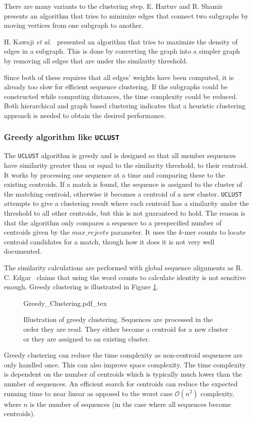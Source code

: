 There are many variants to the clustering step. E. Hartuv and R. Shamir \\
\cite{hartuv} presents an algorithm that tries to minimize edges that
connect two subgraphs by moving vertices from one subgraph to another.

H. Kawaji \textit{et al.}~\cite{kawaji} presented an algorithm that tries to
maximize the density of edges in a subgraph. This is done by converting the
graph into a simpler graph by removing all edges that are under the similarity
threshold.

Since both of these requires that all edges' weights have been computed, it is
already too slow for efficient sequence clustering. If the subgraphs could be
constructed while computing distances, the time complexity could be reduced.
Both hierarchical and graph based clustering indicates that a heuristic
clustering approach is needed to obtain the desired performance.


\subsubsection{Greedy algorithm like \texttt{UCLUST}}

The \texttt{UCLUST} algorithm is greedy and is designed so that all member
sequences have similarity greater than or equal to the similarity threshold,
to their centroid.  It works by processing one sequence at a time and
comparing these to the existing centroids. If a match is found, the sequence
is assigned to the cluster of the matching centroid, otherwise it becomes a
centroid of a new cluster. \texttt{UCLUST} attempts to give a clustering
result where each centroid has a similarity under the threshold to all other
centroids, but this is not guaranteed to hold. The reason is that the
algorithm only compares a sequence to a prespecified number of centroids given
by the $max\_rejects$ parameter. It uses the $k$-mer counts to locate centroid
candidates for a match, though how it does it is not very well documented.

The similarity calculations are performed with global sequence alignments as R.
C. Edgar~\cite{usearch_algorithm}  claims that using the word counts to
calculate identity is not sensitive enough. Greedy clustering is illustrated in
Figure \ref{fig:greedy_clustering}.

\begin{figure}[H]
  \def\svgwidth{\columnwidth}
  {Greedy_Clustering.pdf_tex}
  \caption{Illustration of greedy clustering. Sequences are processed in the
    order they are read. They either become a centroid for a new cluster or
    they are assigned to an existing cluster.}
  \label{fig:greedy_clustering}
\end{figure}

Greedy clustering can reduce the time complexity as non-centroid sequences are
only handled once. This can also improve space complexity. The time complexity
is dependent on the number of centroids which is typically much lower than the
number of sequences. An efficient search for centroids can reduce the expected
running time to near linear as opposed to the worst case
$\mathcal{O}\left(n^2\right)$ complexity, where $n$ is the number of sequences
(in the case where all sequences become centroids).
